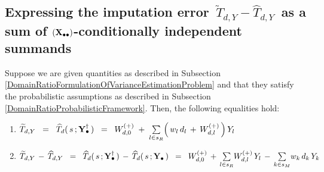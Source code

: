 
\clearpage
\subsection{Expressing the imputation error
\,$\widetilde{T}_{d,Y} - \widehat{T}_{d,Y}$\,
as a sum of $(\mathbf{X}_{\bullet\bullet})$-conditionally independent summands}
\setcounter{theorem}{0}


\vskip 0.1cm
\begin{lemma}
\label{DomainRatioNumeratorImputationError}
\mbox{}
\vskip 0.1cm
\noindent
Suppose we are given quantities as described in Subsection
\ref{DomainRatioFormulationOfVarianceEstimationProblem}
and
that they satisfy the probabilistic assumptions as described in Subsection
\ref{DomainRatioProbabilisticFramework}.
\vskip 0.1cm
\noindent
Then, the following equalities hold:
\renewcommand{\theenumi}{\roman{enumi}}
\renewcommand{\labelenumi}{\mbox{}\;\;\,(\theenumi)$\quad$}
\begin{enumerate}
\item
    $
    \widetilde{T}_{d,Y}
    \;\; = \;\;
    \widehat{T}_{d}(\,s\,;\mathbf{Y}_{\bullet}^{\dagger}\,)
    \;\; = \;\;
        W^{(+)}_{d,0}
        \;+\;
        \underset{l \in s_{R}}{\sum}\!\left(\,w_{l}\,d_{l} \,+\, W^{(+)}_{d,l}\,\right)Y_{l}
    $
\item
    $
    \widetilde{T}_{d,Y} \,-\, \widehat{T}_{d,Y}
    \;\; = \;\;
    \widehat{T}_{d}(\,s\,;\mathbf{Y}_{\bullet}^{\dagger}\,)
    \,-\,
    \widehat{T}_{d}(\,s\,;\mathbf{Y}_{\bullet}\,)
    \;\; = \;\;
        W^{(+)}_{d,0}
        \,+\,
        \underset{l \in s_{R}}{\sum}W^{(+)}_{d,l}\,Y_{l}
        \,-\,
        \underset{k \in s_{M}}{\sum}w_{k}\,d_{k}\,Y_{k}
    $
\end{enumerate}

\end{lemma}

